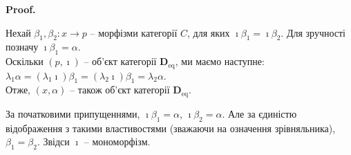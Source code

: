 \documentclass[a4paper, 10pt]{article}
\makeatletter
\theoremstyle{theoremdd}
\renewenvironment{proof}[1][Proof.\\]{\par
\pushQED{\hfill \qed}%
\normalfont \topsep6\p@\@plus6\p@\relax
\trivlist
\item\relax
{\bfseries
#1\@addpunct{.}}\hspace\labelsep\ignorespaces
}{%
\popQED\endtrivlist\@endpefalse
}
\makeatother
\begin{document}
\begin{proof}
Нехай $\beta_1,\beta_2 \colon x \to p$ -- морфізми категорії $C$, для яких $\imath \beta_1 = \imath \beta_2$. Для зручності позначу $\imath \beta_1 = \alpha$.\\
Оскільки $(p,\imath)$ -- об'єкт категорії $\textbf{D}_{\text{eq}}$, ми маємо наступне:\\
$\lambda_1 \alpha = (\lambda_1 \imath) \beta_1 = (\lambda_2 \imath) \beta_1 = \lambda_2 \alpha$.\\
Отже, $(x,\alpha)$ -- також об'єкт категорії $\textbf{D}_{\text{eq}}$.
\begin{figure}[H]
\centering
{}
\end{figure}
\noindent За початковими припущеннями, $\imath \beta_1 = \alpha$, $\imath \beta_2 = \alpha$. Але за єдиністю відображення з такими властивостями (зважаючи на означення зрівняльника), $\beta_1 = \beta_2$. Звідси $\imath$ -- мономорфізм.
\end{proof}
\end{document}
